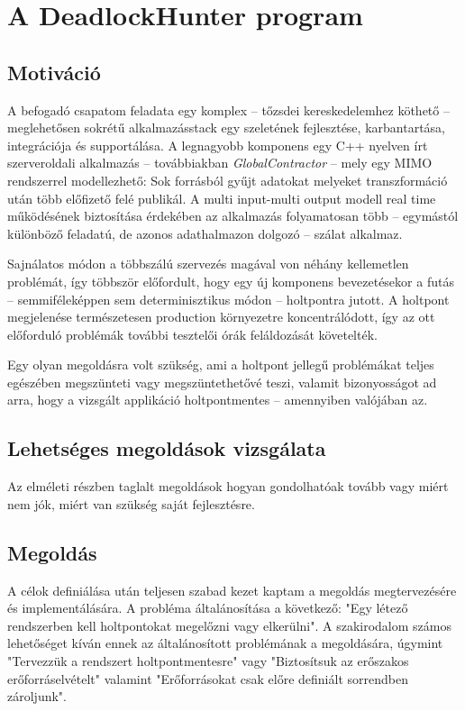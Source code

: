 \chapter{A DeadlockHunter program}
\label{sec:dlhunter}

    \section{Motiváció}
    A befogadó csapatom feladata egy komplex -- tőzsdei kereskedelemhez köthető -- meglehetősen sokrétű alkalmazásstack egy szeletének fejlesztése, karbantartása, integrációja és supportálása. A legnagyobb komponens egy C++ nyelven írt szerveroldali alkalmazás -- továbbiakban \emph{GlobalContractor} -- mely egy MIMO rendszerrel modellezhető: Sok forrásból gyűjt adatokat melyeket transzformáció után több előfizető felé publikál. A multi input-multi output modell real time működésének biztosítása érdekében az alkalmazás folyamatosan több -- egymástól különböző feladatú, de azonos adathalmazon dolgozó -- szálat alkalmaz.
    
    Sajnálatos módon a többszálú szervezés magával von néhány kellemetlen problémát, így többször előfordult, hogy egy új komponens bevezetésekor a futás -- semmiféleképpen sem determinisztikus módon -- holtpontra jutott. A holtpont megjelenése természetesen production környezetre koncentrálódott, így az ott előforduló problémák további tesztelői órák feláldozását követelték.
    
    Egy olyan megoldásra volt szükség, ami a holtpont jellegű problémákat teljes egészében megszünteti vagy megszüntethetővé teszi, valamit bizonyosságot ad arra, hogy a vizsgált applikáció holtpontmentes -- amennyiben valójában az.
    
    \section{Lehetséges megoldások vizsgálata} Az elméleti részben taglalt megoldások hogyan gondolhatóak tovább vagy miért nem jók, miért van szükség saját fejlesztésre.%
    
    \section{Megoldás}
    A célok definiálása után teljesen szabad kezet kaptam a megoldás megtervezésére és implementálására. A probléma általánosítása a következő: "Egy létező rendszerben kell holtpontokat megelőzni vagy elkerülni". A szakirodalom számos lehetőséget kíván ennek az általánosított problémának a megoldására, úgymint "Tervezzük a rendszert holtpontmentesre" vagy "Biztosítsuk az erőszakos erőforráselvételt" valamint "Erőforrásokat csak előre definiált sorrendben zároljunk".
    
